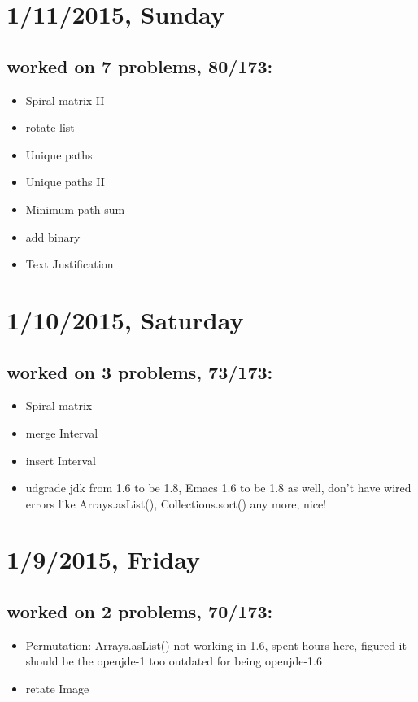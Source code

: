 \documentclass[9pt,b5paper]{article}
\begin{document}
\section{1/11/2015, Sunday}
\label{sec-15}
\subsection{worked on 7 problems, 80/173:}
\label{sec-15-1}
\begin{itemize}
\item Spiral matrix II
\item rotate list
\item Unique paths
\item Unique paths II
\item Minimum path sum
\item add binary
\item Text Justification
\end{itemize}
\section{1/10/2015, Saturday}
\label{sec-16}
\subsection{worked on 3 problems, 73/173:}
\label{sec-16-1}
\begin{itemize}
\item Spiral matrix
\item merge Interval
\item insert Interval
\item udgrade jdk from 1.6 to be 1.8, Emacs 1.6 to be 1.8 as well, don't have wired errors like Arrays.asList(), Collections.sort() any more, nice!
\end{itemize}
\section{1/9/2015, Friday}
\label{sec-17}
\subsection{worked on 2 problems, 70/173:}
\label{sec-17-1}
\begin{itemize}
\item Permutation: Arrays.asList() not working in 1.6, spent hours here, figured it should be the openjde-1 too outdated for being openjde-1.6
\item retate Image
\end{itemize}
\end{document}
